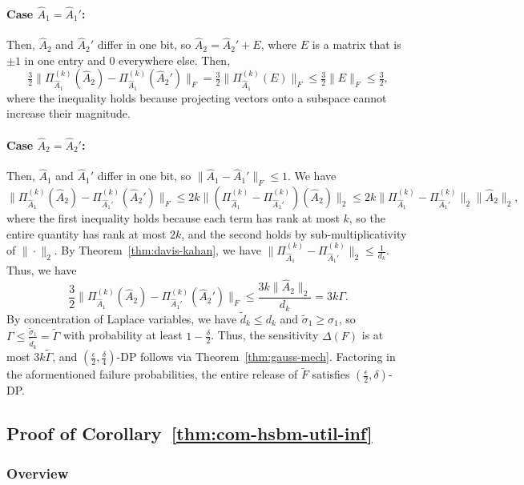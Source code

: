 \paragraph{Case $\hat{A}_1 = \hat{A}_1'$:} Then, $\hat{A}_2$ and $\hat{A}_2'$ differ in one bit, so $\hat{A}_2 = \hat{A}_2' + E$, where $E$ is a matrix that is $\pm 1$ in one entry and $0$ everywhere else.
Then,
\[
\tfrac 3 2\|\Pi_{\hat{A}_1}^{(k)}(\hat{A}_2) - \Pi_{\hat{A}_1}^{(k)}(\hat{A}_2')\|_F = \tfrac 3 2\|\Pi_{\hat{A}_1}^{(k)}(E)\|_F \leq \tfrac 3 2\|E\|_F \leq \tfrac 3 2,
\]
where the inequality holds because projecting vectors onto a subspace cannot increase their magnitude.

\paragraph{Case $\hat{A}_2 = \hat{A}_2'$:} Then, $\hat{A}_1$ and $\hat{A}_1'$ differ in one bit, so $\|\hat{A}_1 - \hat{A}_1'\|_F \leq 1$. We have
\[
\|\Pi_{\hat{A}_1}^{(k)}(\hat{A}_2) - \Pi_{\hat{A}_1'}^{(k)}(\hat{A}_2')\|_F \leq 2k \|(\Pi_{\hat{A}_1}^{(k)} - \Pi_{\hat{A}_1'}^{(k)})(\hat{A}_2)\|_2 \leq 2k\|\Pi_{\hat{A}_1}^{(k)} - \Pi_{\hat{A}_1'}^{(k)}\|_2\|\hat{A}_2\|_2,
\]
where the first inequality holds because each term has rank at most $k$, so the entire quantity has rank at most $2k$, and the  second holds by sub-multiplicativity of $\|\cdot\|_2$.
By Theorem~\ref{thm:davis-kahan}, we have $\|\Pi_{\hat{A}_1}^{(k)} - \Pi_{\hat{A}_1'}^{(k)}\|_2 \leq \frac{1}{d_k}$.
Thus, we have
\[
\frac 3 2 \|\Pi_{\hat{A}_1}^{(k)}(\hat{A}_2) - \Pi_{\hat{A}_1'}^{(k)}(\hat{A}_2')\|_F \leq \frac{3k\|\hat{A}_2\|_2}{d_k} = 3k\Gamma.
\]
By concentration of Laplace variables, we have $\tilde{d}_k \leq d_k$ and $\tilde{\sigma}_1 \geq \sigma_1$, so $\Gamma \leq \frac{\tilde{\sigma}_1}{\tilde{d}_k} = \tilde{\Gamma}$ with probability at least $1-\frac{\delta}{2}$. Thus, the sensitivity $\Delta(F)$ is at most $3k\tilde{\Gamma}$, and $(\tfrac \epsilon 2, \frac{\delta}{4})$-DP follows via Theorem~\ref{thm:gauss-mech}. Factoring in the aformentioned failure probabilities, the entire release of $\tilde{F}$ satisfies $(\tfrac \epsilon 2, \delta)$-DP.


\subsection{Proof of Corollary~\ref{thm:com-hsbm-util-inf}}\label{sec:com-hsbm-util}
\subsubsection{Overview}

